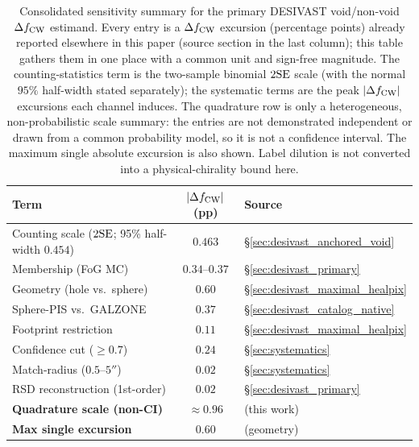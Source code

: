 \documentclass[aps,prd,twocolumn,superscriptaddress,showpacs,preprintnumbers,nofootinbib,longbibliography,floatfix]{revtex4-2}
\begin{document}
\begin{table}[ht]
\caption{Consolidated sensitivity summary for the primary DESIVAST
void/non-void $\Delta f_{\rm CW}$ estimand. Every entry is a
$\Delta f_{\rm CW}$ excursion (percentage points) already reported
elsewhere in this paper (source section in the last column); this table
gathers them in one place with a common unit and sign-free magnitude.
The counting-statistics term is the two-sample binomial $2{\rm SE}$
scale (with the normal $95\%$ half-width stated separately); the systematic terms are the peak $|\Delta f_{\rm CW}|$
excursions each channel induces. The quadrature row is only a
heterogeneous, non-probabilistic scale summary: the entries are not
demonstrated independent or drawn from a common probability model, so it
is not a confidence interval. The maximum single absolute excursion is
also shown. Label dilution is not converted into a physical-chirality
bound here.}
\label{tab:systematic_budget}
{\small
\begin{ruledtabular}
\begin{tabular}{lcl}
Term & $|\Delta f_{\rm CW}|$ (pp) & Source \\
\hline
Counting scale ($2{\rm SE}$; 95\% half-width $0.454$) & $0.463$ & \S\ref{sec:desivast_anchored_void} \\
Membership (FoG MC)              & $0.34$--$0.37$ & \S\ref{sec:desivast_primary} \\
Geometry (hole vs.\ sphere)      & $0.60$ & \S\ref{sec:desivast_maximal_healpix} \\
Sphere-PIS vs.\ GALZONE          & $0.37$ & \S\ref{sec:desivast_catalog_native} \\
Footprint restriction            & $0.11$ & \S\ref{sec:desivast_maximal_healpix} \\
Confidence cut ($\ge 0.7$)       & $0.24$ & \S\ref{sec:systematics} \\
Match-radius ($0.5$--$5''$)      & $0.02$ & \S\ref{sec:systematics} \\
RSD reconstruction (1st-order)   & $0.02$ & \S\ref{sec:desivast_primary} \\
\hline
\textbf{Quadrature scale (non-CI)} & $\approx 0.96$ & (this work) \\
\textbf{Max single excursion}    & $0.60$ & (geometry) \\
\end{tabular}
\end{ruledtabular}
}
\end{table}
\fi
\end{document}

